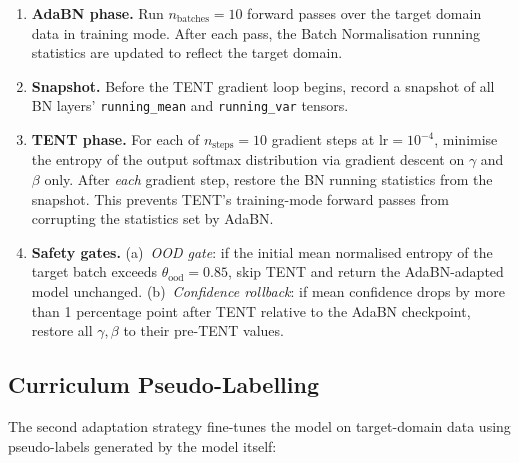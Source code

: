 \begin{enumerate}
  \item \textbf{AdaBN phase.} Run $n_{\text{batches}} = 10$ forward passes over
        the target domain data in training mode.
        After each pass, the Batch Normalisation running statistics are updated
        to reflect the target domain.
  \item \textbf{Snapshot.} Before the TENT gradient loop begins, record a
        snapshot of all BN layers' \texttt{running\_mean} and
        \texttt{running\_var} tensors.
  \item \textbf{TENT phase.} For each of $n_{\text{steps}} = 10$ gradient steps
        at $\text{lr} = 10^{-4}$, minimise the entropy of the output softmax
        distribution via gradient descent on $\gamma$ and $\beta$ only.
        After \textit{each} gradient step, restore the BN running statistics
        from the snapshot.
        This prevents TENT's training-mode forward passes from corrupting the
        statistics set by AdaBN.
  \item \textbf{Safety gates.}
        (a)~\textit{OOD gate}: if the initial mean normalised entropy of the
        target batch exceeds $\theta_{\text{ood}} = 0.85$, skip TENT and return
        the AdaBN-adapted model unchanged.
        (b)~\textit{Confidence rollback}: if mean confidence drops by more than
        1 percentage point after TENT relative to the AdaBN checkpoint,
        restore all $\gamma, \beta$ to their pre-TENT values.
\end{enumerate}

\subsection{Curriculum Pseudo-Labelling}
\label{sec:pseudo_labelling}

The second adaptation strategy fine-tunes the model on target-domain data
using pseudo-labels generated by the model itself:

